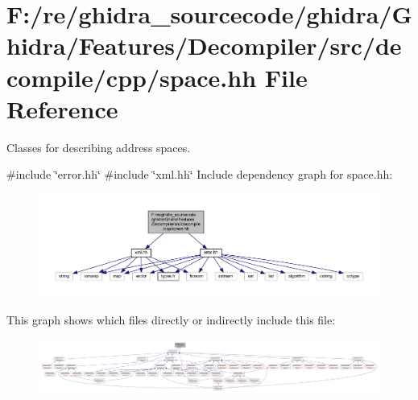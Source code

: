 \hypertarget{space_8hh}{}\section{F\+:/re/ghidra\+\_\+sourcecode/ghidra/\+Ghidra/\+Features/\+Decompiler/src/decompile/cpp/space.hh File Reference}
\label{space_8hh}


Classes for describing address spaces.  


{\ttfamily \#include \char`\"{}error.\+hh\char`\"{}}\newline
{\ttfamily \#include \char`\"{}xml.\+hh\char`\"{}}\newline
Include dependency graph for space.\+hh\+:
\nopagebreak
\begin{figure}[H]
\begin{center}
\leavevmode
\includegraphics[width=350pt]{space_8hh__incl}
\end{center}
\end{figure}
This graph shows which files directly or indirectly include this file\+:
\nopagebreak
\begin{figure}[H]
\begin{center}
\leavevmode
\includegraphics[width=350pt]{space_8hh__dep__incl}
\end{center}
\end{figure}
